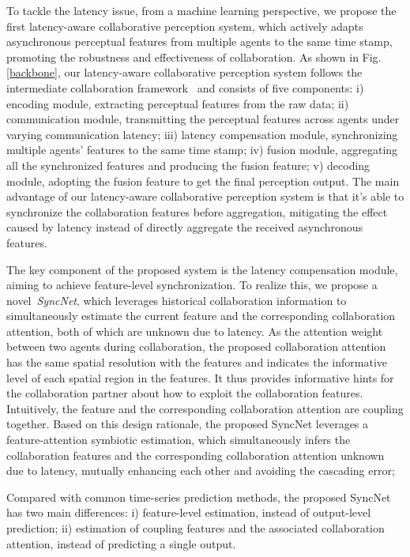 \documentclass[runningheads]{llncs}
\begin{document}
 
\par To tackle the latency issue, from a machine learning perspective, we propose the first latency-aware collaborative perception system, which actively adapts asynchronous perceptual features from multiple agents to the same time stamp, promoting the robustness and effectiveness of collaboration. As shown in Fig.\ref{backbone}, our latency-aware collaborative perception system follows the intermediate collaboration framework~\cite{disconet} and consists of five components: i) encoding module, extracting perceptual features from the raw data; ii) communication module, transmitting the perceptual features across agents under varying communication latency; iii) latency compensation module, synchronizing multiple agents' features to the same time stamp; iv) fusion module, aggregating all the synchronized features and producing the fusion feature; v) decoding module, adopting the fusion feature to get the final perception output. The main advantage of our latency-aware collaborative perception system is that it's able to synchronize the collaboration features before aggregation, mitigating the effect caused by latency instead of directly aggregate the received asynchronous features.


The key component of the proposed system is the latency compensation module, aiming to achieve feature-level synchronization. To realize this, we propose a novel~\textit{SyncNet}, which leverages historical collaboration information to simultaneously estimate the current feature and the corresponding collaboration attention, both of which are unknown due to latency. As the attention weight between two agents during collaboration, the proposed collaboration attention has the same spatial resolution with the features and indicates the informative level of each spatial region in the features. It thus provides informative hints for the collaboration partner about how to exploit the collaboration features. Intuitively, the feature and the corresponding collaboration attention are coupling together. 
Based on this design rationale, the proposed SyncNet leverages a feature-attention symbiotic estimation, which simultaneously infers the collaboration features and the corresponding collaboration attention unknown due to latency, mutually enhancing each other and avoiding the cascading error;

Compared with common time-series prediction methods, the proposed SyncNet has two main differences: i) feature-level estimation, instead of output-level prediction; ii) estimation of coupling features and the associated collaboration attention, instead of predicting a single output.
\end{document}
